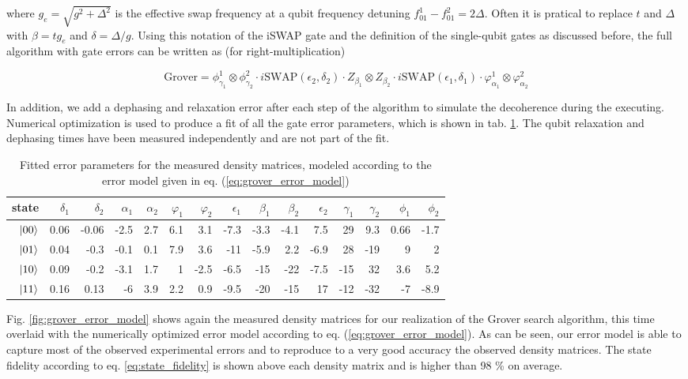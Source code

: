 where $g_e = \sqrt{g^2+\Delta^2}$ is the effective swap frequency at a qubit frequency detuning $f_{01}^1-f_{01}^2 = 2\Delta$. Often it is pratical to replace $t$ and $\Delta$ with $\beta = t g_{e}$ and $\delta = \Delta / g$. Using this notation of the iSWAP gate and the definition of the single-qubit gates as discussed before, the full algorithm with gate errors can be written as (for right-multiplication)

\begin{equation}
\mathrm{Grover} = \phi_{\gamma_1}^1\otimes \phi_{\gamma_2}^2\cdot i\mathrm{SWAP}(\epsilon_2,\delta_2)\cdot Z_{\beta_1}\otimes Z_{\beta_2}\cdot i\mathrm{SWAP}(\epsilon_1,\delta_1)\cdot\varphi_{\alpha_1}^1\otimes \varphi_{\alpha_2}^2 \label{eq:grover_error_model}
\end{equation}

In addition, we add a dephasing and relaxation error after each step of the algorithm to simulate the decoherence during the executing. Numerical optimization is used to produce a fit of all the gate error parameters, which is shown in tab. \ref{tab:grover_error_parameters}. The qubit relaxation and dephasing times have been measured independently and are not part of the fit.

\begin{table}[ht!]
\centering
\footnotesize{
\begin{tabular}{r|rrrrrrrrrrrrrr}
state & $\delta_1$ & $\delta_2$ & $\alpha_1$ & $\alpha_2$ & $\varphi_1$ & $\varphi_2$ & $\epsilon_1$ & $\beta_1$ & $\beta_2$ & $\epsilon_2$ & $\gamma_1$ & $\gamma_2$ & $\phi_1$ & $\phi_2$ \\ \hline
$\left| 00 \right>$ & 0.06 & -0.06 & -2.5 & 2.7 & 6.1 & 3.1 & -7.3 & -3.3 & -4.1 & 7.5 & 29 & 9.3 & 0.66 & -1.7
 \\
$\left| 01 \right>$ & 0.04 & -0.3 & -0.1 & 0.1 & 7.9 & 3.6 & -11 & -5.9 & 2.2 & -6.9 & 28 & -19 &  9 &  2
 \\
$\left| 10 \right>$ & 0.09 & -0.2 & -3.1 & 1.7 &  1 & -2.5 & -6.5 & -15 & -22 & -7.5 & -15 & 32 & 3.6 & 5.2
\\
$\left| 11 \right>$ & 0.16 & 0.13 & -6 & 3.9 & 2.2 & 0.9 & -9.5 & -20 & -15 & 17 & -12 & -32 & -7 & -8.9
\end{tabular}
}
\caption[Fitted gate error parameters of the Grover algorithm]{Fitted error parameters for the measured density matrices, modeled according to the error model given in eq. (\ref{eq:grover_error_model})}
\label{tab:grover_error_parameters}
\end{table}

Fig. \ref{fig:grover_error_model} shows again the measured density matrices for our realization of the Grover search algorithm, this time overlaid with the numerically optimized error model according to eq. (\ref{eq:grover_error_model}). As can be seen, our error model is able to capture most of the observed experimental errors and to reproduce to a very good accuracy the observed density matrices. The state fidelity according to eq. \ref{eq:state_fidelity} is shown above each density matrix and is higher than 98 \% on average.

